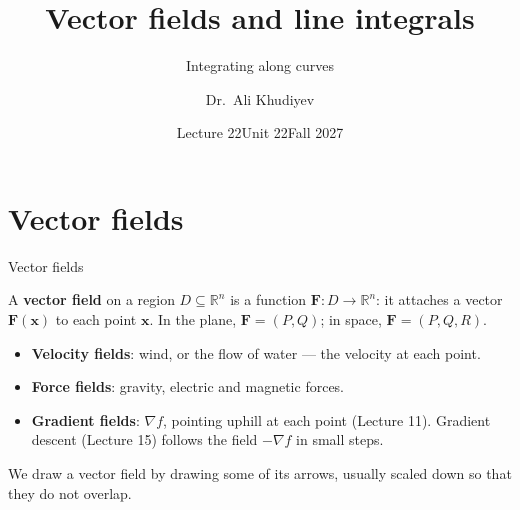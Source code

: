 \documentclass[10pt]{wosm-slides}
\title[L22 \textperiodcentered\ Vector fields and line integrals]{Vector fields and line integrals}
\subtitle{Integrating along curves}
\author{Dr.\ Ali Khudiyev}
\institute{WoSM Academy}
\date{Lecture 22\enspace\textperiodcentered\enspace Unit 22\enspace\textperiodcentered\enspace Fall 2027}
\newcommand{\R}{\mathbb{R}}
\newcommand{\vx}{\mathbf{x}}
\newcommand{\vF}{\mathbf{F}}
\begin{document}
\maketitle



\section{Vector fields}

\begin{frame}{Vector fields}
  \begin{definition}
    A \textbf{vector field} on a region $D \subseteq \R^n$ is a function $\vF\colon D \to \R^n$: it
    attaches a vector $\vF(\vx)$ to each point $\vx$. In the plane, $\vF = (P, Q)$; in space,
    $\vF = (P, Q, R)$.
  \end{definition}
  \pause
  \begin{itemize}
    \item \textbf{Velocity fields}: wind, or the flow of water --- the velocity at each point.
    \item \textbf{Force fields}: gravity, electric and magnetic forces.
    \item \textbf{Gradient fields}: $\nabla f$, pointing uphill at each point (Lecture 11). Gradient
      descent (Lecture 15) follows the field $-\nabla f$ in small steps.
  \end{itemize}
  \pause
  {\small We draw a vector field by drawing some of its arrows, usually scaled down so that they do
  not overlap.\par}
\end{frame}
\end{document}
